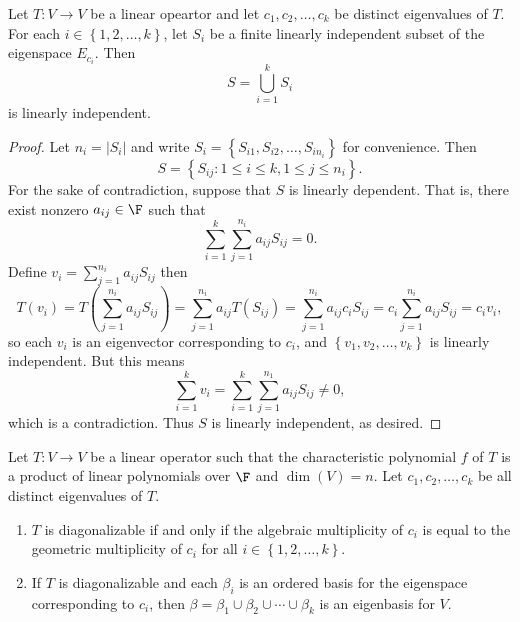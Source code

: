 \documentclass[linearalgebraI]{subfiles}
\begin{document}
    \begin{prop}{}
        Let $T:V\to V$ be a linear opeartor and let $c_1, c_2, \ldots, c_k$ be distinct eigenvalues of $T$. For each $i\in \left\lbrace 1, 2, \ldots, k \right\rbrace$, let $S_i$ be a finite linearly independent subset of the eigenspace $E_{c_i}$. Then
        \begin{equation*}
            S = \bigcup^{k}_{i=1} S_i
        \end{equation*}
        is linearly independent.
    \end{prop}

    \begin{proof}
        Let $n_i = |S_i|$ and write $S_i = \left\lbrace S_{i1}, S_{i2}, \ldots, S_{in_i} \right\rbrace$ for convenience. Then
        \begin{equation*}
            S = \left\lbrace S_{ij}: 1\leq i\leq k, 1\leq j\leq n_i \right\rbrace.
        \end{equation*}
        For the sake of contradiction, suppose that $S$ is linearly dependent. That is, there exist nonzero $a_{ij}\in\F$ such that
        \begin{equation*}
            \sum^k_{i=1} \sum^{n_i}_{j=1} a_{ij}S_{ij} = 0.
        \end{equation*}
        Define $v_i = \sum^{n_i}_{j=1} a_{ij}S_{ij}$ then
        \begin{equation*}
            T \left( v_i \right) = T \left( \sum^{n_i}_{j=1} a_{ij}S_{ij} \right) = \sum^{n_i}_{j=1} a_{ij} T \left( S_{ij} \right) = \sum^{n_i}_{j=1} a_{ij}c_iS_{ij} = c_i \sum^{n_i}_{j=1} a_{ij}S_{ij} = c_iv_i,
        \end{equation*}
        so each $v_i$ is an eigenvector corresponding to $c_i$, and $\left\lbrace v_1, v_2, \ldots, v_k \right\rbrace$ is linearly independent. But this means
        \begin{equation*}
            \sum^k_{i=1} v_i = \sum^k_{i=1} \sum^{n_1}_{j=1} a_{ij}S_{ij} \neq 0,
        \end{equation*}
        which is a contradiction. Thus $S$ is linearly independent, as desired.
    \end{proof}

    \begin{prop}{}
        Let $T:V\to V$ be a linear operator such that the characteristic polynomial $f$ of $T$ is a product of linear polynomials over $\F$ and $\dim(V) = n$. Let $c_1, c_2, \ldots, c_k$ be all distinct eigenvalues of $T$.

        \begin{enumerate}
            \item $T$ is diagonalizable if and only if the algebraic multiplicity of $c_i$ is equal to the geometric multiplicity of $c_i$ for all $i\in \left\lbrace 1, 2, \ldots, k \right\rbrace$.
            \item If $T$ is diagonalizable and each $\beta_i$ is an ordered basis for the eigenspace corresponding to $c_i$, then $\beta = \beta_1\cup\beta_2\cup\cdots\cup\beta_k$ is an eigenbasis for $V$.
        \end{enumerate}
    \end{prop}
\end{document}
